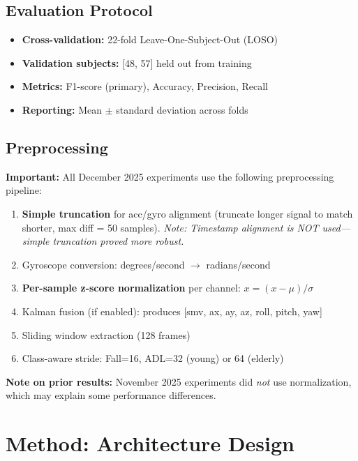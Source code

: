 \documentclass{article}
\begin{document}
\subsection{Evaluation Protocol}

\begin{itemize}
    \item \textbf{Cross-validation:} 22-fold Leave-One-Subject-Out (LOSO)
    \item \textbf{Validation subjects:} [48, 57] held out from training
    \item \textbf{Metrics:} F1-score (primary), Accuracy, Precision, Recall
    \item \textbf{Reporting:} Mean $\pm$ standard deviation across folds
\end{itemize}

\subsection{Preprocessing}
\label{sec:preprocessing}

\textbf{Important:} All December 2025 experiments use the following preprocessing pipeline:

\begin{enumerate}
    \item \textbf{Simple truncation} for acc/gyro alignment (truncate longer signal to match shorter, max diff = 50 samples). \textit{Note: Timestamp alignment is NOT used---simple truncation proved more robust.}
    \item Gyroscope conversion: degrees/second $\rightarrow$ radians/second
    \item \textbf{Per-sample z-score normalization} per channel: $x = (x - \mu) / \sigma$
    \item Kalman fusion (if enabled): produces [smv, ax, ay, az, roll, pitch, yaw]
    \item Sliding window extraction (128 frames)
    \item Class-aware stride: Fall=16, ADL=32 (young) or 64 (elderly)
\end{enumerate}

\textbf{Note on prior results:} November 2025 experiments did \textit{not} use normalization, which may explain some performance differences.

\section{Method: Architecture Design}
\end{document}
